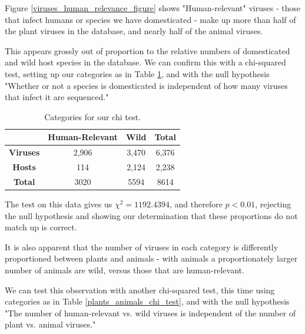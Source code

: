 \documentclass[12pt]{article}
\begin{document}
    Figure \ref{viruses_human_relevance_figure} shows "Human-relevant" viruses
    - those that infect humans or species we have domesticated - make up more
    than half of the plant viruses in the database, and nearly half of the animal
    viruses.
    
    This appears grossly out of proportion to the relative numbers of domesticated
    and wild host species in the database. We can confirm this with a chi-squared
    test, setting up our categories as in Table \ref{domestic_wild_chi_test}, and
    with the null hypothesis "Whether or not a species is domesticated is independent
    of how many viruses that infect it are sequenced."

    \begin{table}[H]
        \begin{center}
            \begin{tabular}{|c|c|c|c|}
                \hline
                                 & \textbf{Human-Relevant} & \textbf{Wild} & \textbf{Total} \\ \hline
                \textbf{Viruses} & 2,906                   & 3,470         & 6,376          \\ \hline
                \textbf{Hosts}   & 114                     & 2,124         & 2,238          \\ \hline
                \textbf{Total}   & 3020                    & 5594          & 8614           \\ \hline
            \end{tabular}
        \end{center}
        \caption{Categories for our chi test.}
        \label{domestic_wild_chi_test}
    \end{table}

    The test on this data gives us $\chi^2 = 1192.4394$, and therefore $p < 0.01$,
    rejecting the null hypothesis and showing our determination that these proportions
    do not match up is correct.

    It is also apparent that the number of viruses in each category is differently
    proportioned between plants and animals - with animals a proportionately
    larger number of animals are wild, versus those that are human-relevant.

    We can test this observation with another chi-squared test, this time using
    categories as in Table \ref{plants_animals_chi_test}, and with the null
    hypothesis "The number of human-relevant vs. wild viruses is independent of
    the number of plant vs. animal viruses."
\end{document}
